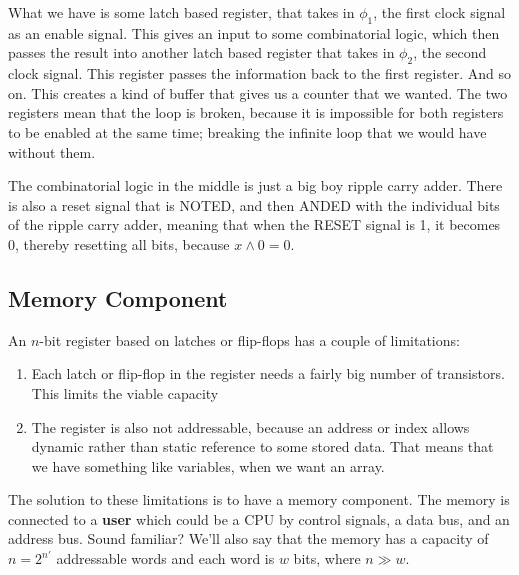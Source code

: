 \documentclass[11pt,a4paper,titlepage,dvipsnames,cmyk]{scrartcl}
\begin{document}
What we have is some latch based register, that takes in $\phi_1$, the
first clock signal as an enable signal. This gives an input to some
combinatorial logic, which then passes the result into another latch based
register that takes in $\phi_2$, the second clock signal. This register
passes the information back to the first register. And so on. This creates
a kind of buffer that gives us a counter that we wanted. The two registers
mean that the loop is broken, because it is impossible for both registers
to be enabled at the same time; breaking the infinite loop that we would
have without them.

The combinatorial logic in the middle is just a big boy ripple carry
adder. There is also a reset signal that is NOTED, and then ANDED with the
individual bits of the ripple carry adder, meaning that when the RESET
signal is 1, it becomes 0, thereby resetting all bits, because $x \wedge 0
= 0$.

\subsection{Memory Component}%
\label{sub:memory}

An $n$-bit register based on latches or flip-flops has a couple of
limitations:
\begin{enumerate}
    \item Each latch or flip-flop in the register needs a fairly big
        number of transistors. This limits the viable capacity
    \item The register is also not addressable, because an address or
        index allows dynamic rather than static reference to some stored
        data. That means that we have something like variables, when we
        want an array.
\end{enumerate}

The solution to these limitations is to have a memory component. The
memory is connected to a \textbf{user} which could be a CPU by control
signals, a data bus, and an address bus. Sound familiar? We'll also say
that the memory has a capacity of $n = 2^{n'}$ addressable words and each
word is $w$ bits, where $n \gg w$.
\end{document}
